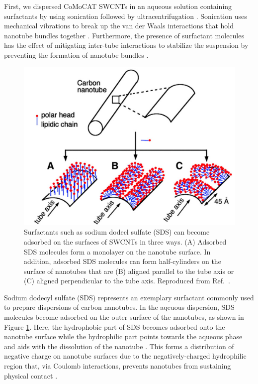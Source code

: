 First, we dispersed CoMoCAT SWCNTs in an aqueous solution containing surfactants by using sonication followed by ultracentrifugation \cite{liu1998fullerene, o2001reversible, o2002band}. Sonication uses mechanical vibrations to break up the van der Waals interactions that hold nanotube bundles together . Furthermore, the presence of surfactant molecules has the effect of mitigating inter-tube interactions to stabilize the suspension by preventing the formation of nanotube bundles \cite{liu1998fullerene, o2001reversible, o2002band}.

\begin{figure}[H]
\centering
\includegraphics[scale=0.3]{images/chapter_methods/surfactant_tkalya}
\caption{Surfactants such as sodium dodecl sulfate (SDS) can become adsorbed on the surfaces of SWCNTs in three ways. (A) Adsorbed SDS molecules form a monolayer on the nanotube surface. In addition, adsorbed SDS molecules can form half-cylinders on the surface of nanotubes that are (B) aligned parallel to the tube axis or (C) aligned perpendicular to the tube axis. Reproduced from Ref.\ \cite{richard2003supramolecular}. }
\label{fig:sds_molecule}
\end{figure}

Sodium dodecyl sulfate (SDS) represents an exemplary surfactant commonly used to prepare dispersions of carbon nanotubes. In the aqeuous dispersion, SDS molecules become adsorbed on the outer surface of the nanotubes, as shown in Figure \ref{fig:sds_molecule}. Here, the hydrophobic part of SDS becomes adsorbed onto the nanotube surface while the hydrophilic part points towards the aqueous phase and aids with the dissolution of the nanotube \cite{richard2003supramolecular}. This forms a distribution of negative charge on nanotube surfaces due to the negatively-charged hydrophilic region that, via Coulomb interactions, prevents nanotubes from sustaining physical contact \cite{richard2003supramolecular}.


